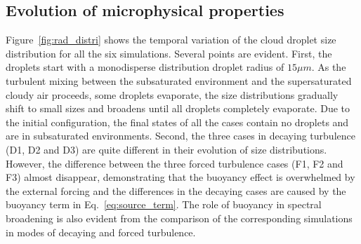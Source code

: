 \documentclass[draft,linenumbers]{AGUJournal}
\newcommand{\Eq}[1]{Eq.~\eqref{#1}} \newcommand{\Fig}[1]{Figure~\ref{#1}}
\begin{document}
\subsection{Evolution of microphysical properties}
\Fig{fig:rad_distri} shows the temporal variation of the cloud droplet size distribution for all the six simulations. Several points are evident. First, the droplets start with a monodisperse distribution droplet radius of $15\mu m$. As the turbulent mixing between the subsaturated environment and the supersaturated cloudy air proceeds, some droplets evaporate, the size distributions gradually shift to small sizes and broadens until all droplets completely evaporate. Due to the initial configuration, the final states of all the cases contain no droplets and are in subsaturated environments. Second, the three cases in decaying turbulence (D1, D2 and D3) are quite different in their evolution of size distributions. However, the difference between the three forced turbulence cases (F1, F2 and F3) almost disappear, demonstrating that the buoyancy effect is overwhelmed by the external forcing and the differences in the decaying cases are caused by the buoyancy term in \Eq{eq:source_term}. The role of buoyancy in spectral broadening is also evident from the comparison of the corresponding simulations in modes of decaying and forced turbulence.
\end{document}

